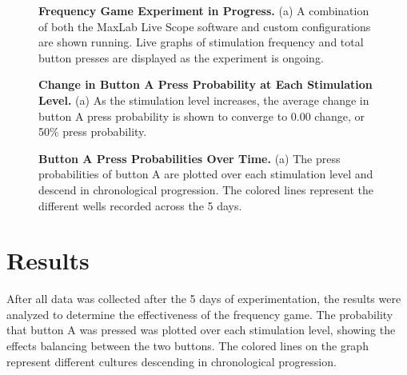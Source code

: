 \documentclass{article} %
\begin{document}
\begin{figure}
    \centering
    \caption{\textbf{Frequency Game Experiment in Progress.} (a) A combination of both the MaxLab Live Scope software and custom configurations are shown running. Live graphs of stimulation frequency and total button presses are displayed as the experiment is ongoing.}
\end{figure}

\begin{figure}
    \centering
    \caption{\textbf{Change in Button A Press Probability at Each Stimulation Level.} (a) As the stimulation level increases, the average change in button A press probability is shown to converge to 0.00 change, or 50\% press probability.}
\end{figure}

\begin{figure}
    \centering
    \caption{\textbf{Button A Press Probabilities Over Time.} (a) The press probabilities of button A are plotted over each stimulation level and descend in chronological progression. The colored lines represent the different wells recorded across the 5 days.}
\end{figure}




\section{Results}
After all data was collected after the 5 days of experimentation, the results were analyzed to determine the effectiveness of the frequency game. The probability that button A was pressed was plotted over each stimulation level, showing the effects balancing between the two buttons. The colored lines on the graph represent different cultures descending in chronological progression.
\end{document}
